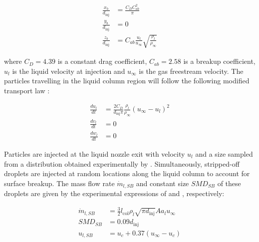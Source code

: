 \begin{subequations}
\label{eq:jaegle_breakup_point}
\begin{align}
\frac{x_b}{d_\mathrm{inj}} &= \frac{C_D C_{ab}^2}{\pi} \\
\frac{y_b}{d_\mathrm{inj}} &= 0 \\
\frac{z_b}{d_\mathrm{inj}} &= C_{ab} \frac{u_l}{u_\infty} \sqrt{\frac{\rho_l}{\rho_\infty}}
\end{align}
\end{subequations}

where $C_D = 4.39$ is a constant drag coefficient, $C_{ab} = 2.58$ is a breakup coefficient, $u_l$ is the liquid velocity at injection and $u_\infty$ is the gas freestream velocity. The particles travelling in the liquid column region will follow the following modified transport law :

\begin{subequations}
\label{eq:momentum_jaegle_model}
\begin{align}
\frac{d u_l}{d t} &= \frac{2 C_D}{d_\mathrm{inj} \pi} \frac{\rho_l}{\rho_\infty} \left( u_\infty - u_l \right)^2  \\
\frac{d v_l}{d t} &= 0 \\
\frac{d w_l}{d t} &= 0 
\end{align}
\end{subequations}

Particles are injected at the liquid nozzle exit with velocity $u_l$ and a size sampled from a distribution obtained experimentally by . Simultaneously, stripped-off droplets are injected at random locations along the liquid column to account for surface breakup. The mass flow rate $\dot{m}_{l,SB}$ and constant size $SMD_{SB}$ of these droplets are given by the experimental expressions of  and , respectively:

\begin{subequations}
\label{eq:surface_breakup_jaegle_model}
\begin{align}
\dot{m}_{l,SB} &= \frac{3}{2} l_\mathrm{col} \rho_l \sqrt{\pi d_\mathrm{inj}} A a_l u_\infty \\
SMD_{SB} &= 0.09 d_\mathrm{inj} \\
u_{l,SB} &= u_c + 0.37 \left( u_\infty - u_c \right)
\end{align}
\end{subequations}

